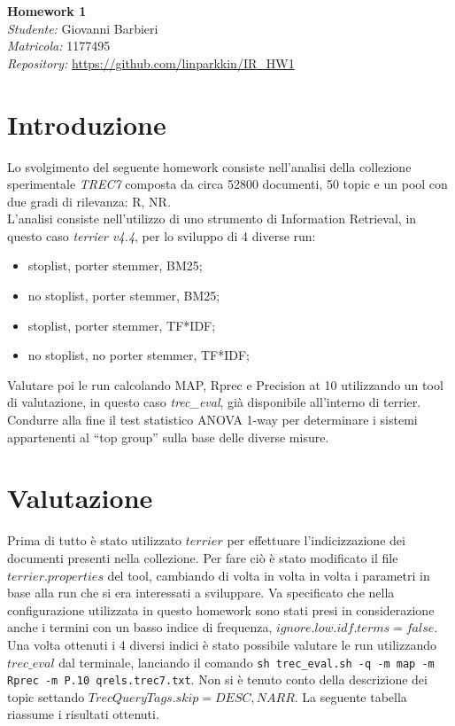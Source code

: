 \documentclass[a4paper, 11pt]{article}
\begin{document}
\noindent
\large\textbf{Homework 1} \\
\normalsize \textit{Studente:} Giovanni Barbieri\\
\textit{Matricola:} 1177495\\
\textit{Repository:} \url{https://github.com/linparkkin/IR_HW1}


\section*{Introduzione}
Lo svolgimento del seguente homework consiste nell'analisi della collezione sperimentale \textit{TREC7} composta da circa 52800 documenti, 50 topic e un pool con due gradi di rilevanza: R, NR. \\
L'analisi consiste nell'utilizzo di uno strumento di Information Retrieval, in questo caso \textit{terrier v4.4}, per lo sviluppo di 4 diverse run: 
\begin{itemize}
 \item stoplist, porter stemmer, BM25;
 \item no stoplist, porter stemmer, BM25;
 \item stoplist, porter stemmer, TF*IDF;
 \item no stoplist, no porter stemmer, TF*IDF;
\end{itemize}
Valutare poi le run calcolando MAP, Rprec e Precision at 10 utilizzando un tool di valutazione, in questo caso \textit{trec\_eval}, già disponibile all'interno di terrier. \\
Condurre alla fine il test statistico  ANOVA 1-way per determinare i sistemi appartenenti al ``top group'' sulla base delle diverse misure. 

\section*{Valutazione}

Prima di tutto è stato utilizzato $terrier$ per effettuare l'indicizzazione dei documenti presenti nella collezione. Per fare ciò è stato modificato il file $terrier.properties$ del tool, cambiando di volta in volta in volta i parametri in base alla run che si era interessati a sviluppare. Va specificato che nella configurazione utilizzata in questo homework sono stati presi in considerazione anche i termini con un basso indice di frequenza, $ignore.low.idf.terms=false$. \\
Una volta ottenuti i 4 diversi indici è stato possibile valutare le run utilizzando $trec\_eval$ dal terminale, lanciando il comando \texttt{sh trec\_eval.sh -q -m map -m Rprec -m P.10 qrels.trec7.txt}. Non si è tenuto conto della descrizione dei topic settando $TrecQueryTags.skip=DESC,NARR$.
La seguente tabella riassume i risultati ottenuti.
\end{document}
